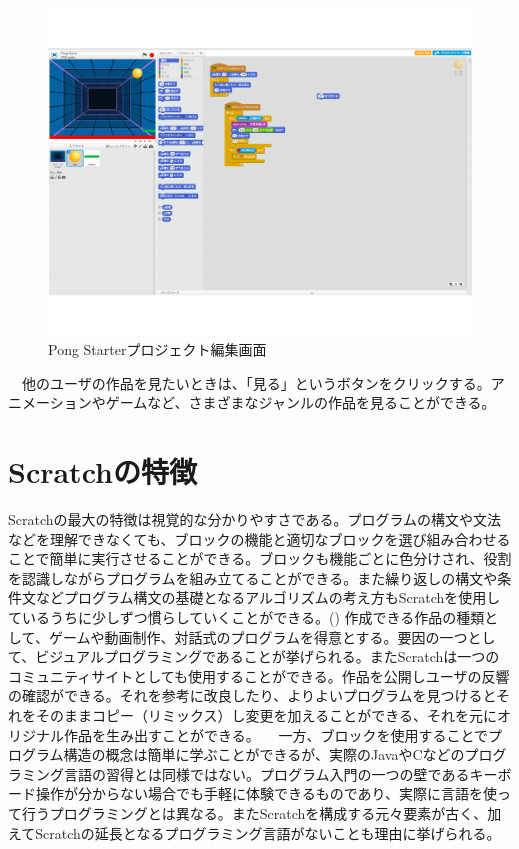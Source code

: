 \documentclass[a4paper,10pt,onecolumn,oneside,openany]{jsbook}
\begin{document}
 \begin{figure}[!h]
  \centering
   \includegraphics[scale=0.5]{pong_starter_editor.pdf}
  \caption{Pong Starterプロジェクト編集画面}
  \label{pseditor}
 \end{figure}
　他のユーザの作品を見たいときは、「見る」というボタンをクリックする。アニメーションやゲームなど、さまざまなジャンルの作品を見ることができる。
\section{Scratchの特徴}
Scratchの最大の特徴は視覚的な分かりやすさである。プログラムの構文や文法などを理解できなくても、ブロックの機能と適切なブロックを選び組み合わせることで簡単に実行させることができる。ブロックも機能ごとに色分けされ、役割を認識しながらプログラムを組み立てることができる。また繰り返しの構文や条件文などプログラム構文の基礎となるアルゴリズムの考え方もScratchを使用しているうちに少しずつ慣らしていくことができる。(\cite{scratch_article}) 作成できる作品の種類として、ゲームや動画制作、対話式のプログラムを得意とする。要因の一つとして、ビジュアルプログラミングであることが挙げられる。またScratchは一つのコミュニティサイトとしても使用することができる。作品を公開しユーザの反響の確認ができる。それを参考に改良したり、よりよいプログラムを見つけるとそれをそのままコピー（リミックス）し変更を加えることができる、それを元にオリジナル作品を生み出すことができる。
　一方、ブロックを使用することでプログラム構造の概念は簡単に学ぶことができるが、実際のJavaやCなどのプログラミング言語の習得とは同様ではない。プログラム入門の一つの壁であるキーボード操作が分からない場合でも手軽に体験できるものであり、実際に言語を使って行うプログラミングとは異なる。またScratchを構成する元々要素が古く、加えてScratchの延長となるプログラミング言語がないことも理由に挙げられる。
\end{document}
